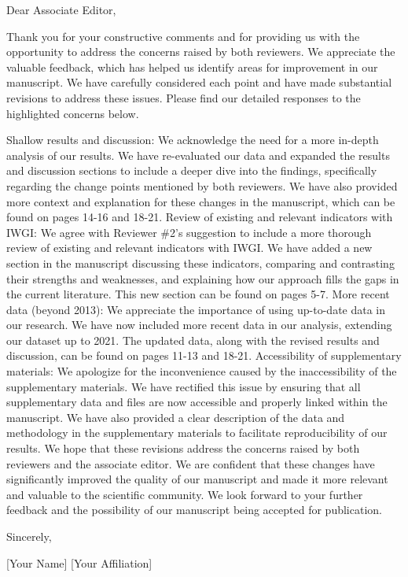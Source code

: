 Dear Associate Editor,

Thank you for your constructive comments and for providing us with the opportunity to address the concerns raised by both reviewers. We appreciate the valuable feedback, which has helped us identify areas for improvement in our manuscript. We have carefully considered each point and have made substantial revisions to address these issues. Please find our detailed responses to the highlighted concerns below.

Shallow results and discussion:
We acknowledge the need for a more in-depth analysis of our results. We have re-evaluated our data and expanded the results and discussion sections to include a deeper dive into the findings, specifically regarding the change points mentioned by both reviewers. We have also provided more context and explanation for these changes in the manuscript, which can be found on pages 14-16 and 18-21.
Review of existing and relevant indicators with IWGI:
We agree with Reviewer \#2's suggestion to include a more thorough review of existing and relevant indicators with IWGI. We have added a new section in the manuscript discussing these indicators, comparing and contrasting their strengths and weaknesses, and explaining how our approach fills the gaps in the current literature. This new section can be found on pages 5-7.
More recent data (beyond 2013):
We appreciate the importance of using up-to-date data in our research. We have now included more recent data in our analysis, extending our dataset up to 2021. The updated data, along with the revised results and discussion, can be found on pages 11-13 and 18-21.
Accessibility of supplementary materials:
We apologize for the inconvenience caused by the inaccessibility of the supplementary materials. We have rectified this issue by ensuring that all supplementary data and files are now accessible and properly linked within the manuscript. We have also provided a clear description of the data and methodology in the supplementary materials to facilitate reproducibility of our results.
We hope that these revisions address the concerns raised by both reviewers and the associate editor. We are confident that these changes have significantly improved the quality of our manuscript and made it more relevant and valuable to the scientific community. We look forward to your further feedback and the possibility of our manuscript being accepted for publication.

Sincerely,

[Your Name]
[Your Affiliation]
